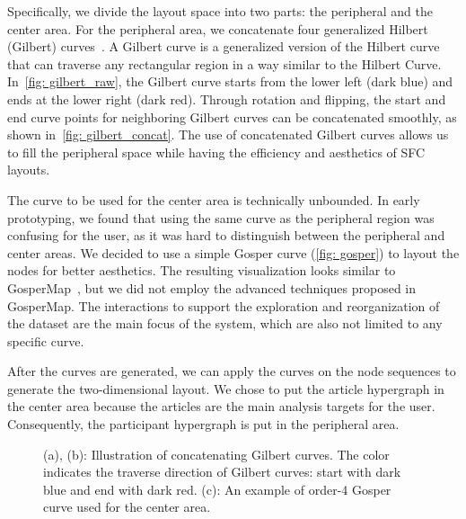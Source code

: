 Specifically, we divide the layout space into two parts: the peripheral and the center area.
For the peripheral area, we concatenate four generalized Hilbert (Gilbert) curves~\cite{gilbert}.
A Gilbert curve is a generalized version of the Hilbert curve that can traverse any rectangular region in a way similar to the Hilbert Curve.
In~\autoref{fig: gilbert_raw}, the Gilbert curve starts from the lower left (dark blue) and ends at the lower right (dark red).
Through rotation and flipping, the start and end curve points for neighboring Gilbert curves can be concatenated smoothly, as shown in~\autoref{fig: gilbert_concat}.
The use of concatenated Gilbert curves allows us to fill the peripheral space while having the efficiency and aesthetics of SFC layouts.

The curve to be used for the center area is technically unbounded. 
In early prototyping, we found that using the same curve as the peripheral region was confusing for the user, as it was hard to distinguish between the peripheral and center areas.
We decided to use a simple Gosper curve (\autoref{fig: gosper}) to layout the nodes for better aesthetics.
The resulting visualization looks similar to GosperMap~\cite{auber2013gospermap}, but we did not employ the advanced techniques proposed in GosperMap.
The interactions to support the exploration and reorganization of the dataset are the main focus of the system, which are also not limited to any specific curve.

After the curves are generated, we can apply the curves on the node sequences to generate the two-dimensional layout.
We chose to put the article hypergraph in the center area because the articles are the main analysis targets for the user.
Consequently, the participant hypergraph is put in the peripheral area.
\begin{figure}%
    \centering
    \qquad
    \qquad
    \caption{
        (a), (b): Illustration of concatenating Gilbert curves. 
        The color indicates the traverse direction of Gilbert curves: start with dark blue and end with dark red.
        (c): An example of order-4 Gosper curve used for the center area.
    }%
    \label{fig: gilbert}%
\end{figure}

